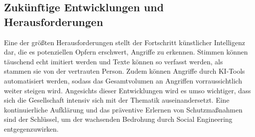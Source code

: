 \documentclass[12pt, a4paper, oneside]{scrartcl}
\begin{document}
\subsection{Zukünftige Entwicklungen und Herausforderungen}
Eine der größten Herausforderungen stellt der Fortschritt künstlicher Intelligenz dar, die es potenziellen Opfern 
erschwert, Angriffe zu erkennen. Stimmen können
täuschend echt imitiert werden und Texte können so verfasst werden, als stammen sie von der vertrauten Person.
Zudem können Angriffe durch KI-Tools automatisiert werden, sodass das Gesamtvolumen an Angriffen vorraussichtlich weiter
steigen wird. 
Angesichts dieser Entwicklungen wird es umso wichtiger, dass sich die Gesellschaft intensiv sich mit der Thematik auseinandersetzt.
Eine kontinuierliche Aufklärung und das präventive Erlernen von Schutzmaßnahmen sind der Schlüssel, um der wachsenden 
Bedrohung durch Social Engineering entgegenzuwirken.

\clearpage
\printbibliography[title={Literaturverzeichnis}]
\end{document}
